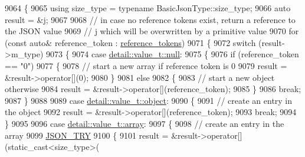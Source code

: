 \begin{DoxyCode}
9064     \{
9065         \textcolor{keyword}{using} size\_type = \textcolor{keyword}{typename} BasicJsonType::size\_type;
9066         \textcolor{keyword}{auto} result = &j;
9067 
9068         \textcolor{comment}{// in case no reference tokens exist, return a reference to the JSON value}
9069         \textcolor{comment}{// j which will be overwritten by a primitive value}
9070         \textcolor{keywordflow}{for} (\textcolor{keyword}{const} \textcolor{keyword}{auto}& reference\_token : \hyperlink{classnlohmann_1_1json__pointer_a07a990a6838de4f38ee9d881e7b9fd61}{reference\_tokens})
9071         \{
9072             \textcolor{keywordflow}{switch} (result->m\_type)
9073             \{
9074                 \textcolor{keywordflow}{case} \hyperlink{namespacenlohmann_1_1detail_a1ed8fc6239da25abcaf681d30ace4985a37a6259cc0c1dae299a7866489dff0bd}{detail::value\_t::null}:
9075                 \{
9076                     \textcolor{keywordflow}{if} (reference\_token == \textcolor{stringliteral}{"0"})
9077                     \{
9078                         \textcolor{comment}{// start a new array if reference token is 0}
9079                         result = &result->operator[](0);
9080                     \}
9081                     \textcolor{keywordflow}{else}
9082                     \{
9083                         \textcolor{comment}{// start a new object otherwise}
9084                         result = &result->operator[](reference\_token);
9085                     \}
9086                     \textcolor{keywordflow}{break};
9087                 \}
9088 
9089                 \textcolor{keywordflow}{case} \hyperlink{namespacenlohmann_1_1detail_a1ed8fc6239da25abcaf681d30ace4985aa8cfde6331bd59eb2ac96f8911c4b666}{detail::value\_t::object}:
9090                 \{
9091                     \textcolor{comment}{// create an entry in the object}
9092                     result = &result->operator[](reference\_token);
9093                     \textcolor{keywordflow}{break};
9094                 \}
9095 
9096                 \textcolor{keywordflow}{case} \hyperlink{namespacenlohmann_1_1detail_a1ed8fc6239da25abcaf681d30ace4985af1f713c9e000f5d3f280adbd124df4f5}{detail::value\_t::array}:
9097                 \{
9098                     \textcolor{comment}{// create an entry in the array}
9099                     \hyperlink{json_8hpp_a985d3b82445302c57257f6432f261fe9}{JSON\_TRY}
9100                     \{
9101                         result = &result->operator[](\textcolor{keyword}{static\_cast<}size\_type\textcolor{keyword}{>}(

\end{DoxyCode}
